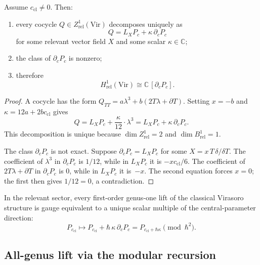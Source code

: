 \begin{theorem}
\label{thm:H1-virasoro}
Assume $c_{\mathrm{cl}}\neq 0$. Then:
\begin{enumerate}[leftmargin=2.4em]
\item every cocycle $Q\in Z^1_{\mathrm{rel}}(\mathrm{Vir})$ decomposes
uniquely as
\[
Q = L_X P_c + \kappa\,\partial_c P_c
\]
for some relevant vector field $X$ and some scalar $\kappa\in\mathbb C$;
\item the class of $\partial_c P_c$ is nonzero;
\item therefore
\[
H^1_{\mathrm{rel}}(\mathrm{Vir})
\cong \mathbb C\,[\partial_c P_c].
\]
\end{enumerate}
\end{theorem}

\begin{proof}
A cocycle has the form $Q_{TT}=a\lambda^3+b(2T\lambda+\partial T)$.
Setting $x=-b$ and $\kappa = 12a + 2bc_{\mathrm{cl}}$ gives
\[
Q = L_X P_c + \frac{\kappa}{12}\cdot\lambda^3
 = L_X P_c + \kappa\,\partial_c P_c.
\]
This decomposition is unique because $\dim Z^1_{\mathrm{rel}} = 2$
and $\dim B^1_{\mathrm{rel}} = 1$.

The class $\partial_c P_c$ is not exact. Suppose
$\partial_c P_c = L_X P_c$ for some $X = x\,T\,\delta/\delta T$.
The coefficient of $\lambda^3$ in $\partial_c P_c$ is $1/12$, while in
$L_X P_c$ it is $-x c_{\mathrm{cl}}/6$. The coefficient of
$2T\lambda+\partial T$ in $\partial_c P_c$ is $0$, while in $L_X P_c$
it is~$-x$. The second equation forces $x=0$; the first then gives
$1/12 = 0$, a contradiction.
\end{proof}

\begin{corollary}
\label{cor:virasoro-unique-lift}
In the relevant sector, every first-order genus-one lift of the classical
Virasoro structure is gauge equivalent to a unique scalar multiple of the
central-parameter direction:
\[
P_{c_{\mathrm{cl}}} \longmapsto P_{c_{\mathrm{cl}}} + \hbar\,\kappa\,\partial_c P_c
= P_{c_{\mathrm{cl}}+\hbar\kappa} \pmod{\hbar^2}.
\]
\end{corollary}

\subsection{All-genus lift via the modular recursion}
\label{subsec:virasoro-all-genus-lift}


